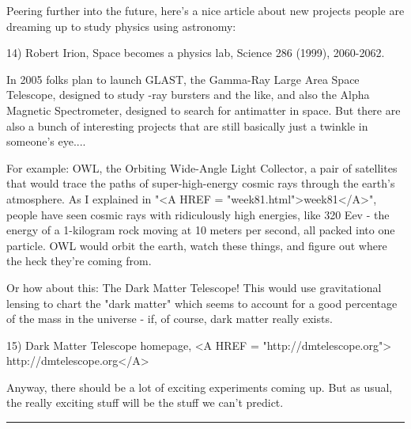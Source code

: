 Peering further into the future, here's a nice article about new
projects people are dreaming up to study physics using astronomy:

14) Robert Irion, Space becomes a physics lab, Science 286 (1999),
2060-2062.

In 2005 folks plan to launch GLAST, the Gamma-Ray Large Area Space 
Telescope, designed to study \gamma -ray bursters and the like, and
also the Alpha Magnetic Spectrometer, designed to search for 
antimatter in space.   But there are also a bunch of interesting
projects that are still basically just a twinkle in someone's eye....

For example: OWL, the Orbiting Wide-Angle Light Collector, a
pair of satellites that would trace the paths of super-high-energy 
cosmic rays through the earth's atmosphere.  As I explained in
"<A HREF = "week81.html">week81</A>", people have seen 
cosmic rays with ridiculously high
energies, like 320 Eev - the energy of a 1-kilogram rock moving
at 10 meters per second, all packed into one particle.  OWL would
orbit the earth, watch these things, and figure out where the
heck they're coming from.    

Or how about this: The Dark Matter Telescope!  This would use 
gravitational lensing to chart the "dark matter" which seems 
to account
for a good percentage of the mass in the universe - if, of course, dark
matter really exists.

15) Dark Matter Telescope homepage, <A HREF = "http://dmtelescope.org">
http://dmtelescope.org</A>

Anyway, there should be a lot of exciting experiments coming up.  But
as usual, the really exciting stuff will be the stuff we can't predict.





 \par\noindent\rule{\textwidth}{0.4pt}


